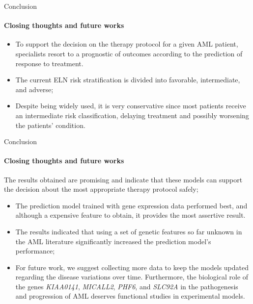 \begin{frame}{Conclusion}
    \framesubtitle{Closing thoughts and future works}

    \begin{itemize}
        \item To support the decision on the therapy protocol for a given AML patient, specialists resort to a prognostic of outcomes according to the prediction of response to treatment.
        \item The current ELN risk stratification is divided into favorable, intermediate, and adverse;
        \item Despite being widely used, it is very conservative since most patients receive an intermediate risk classification, delaying treatment and possibly worsening the patients' condition.
        
    \end{itemize}

\end{frame}

\begin{frame}{Conclusion}
    \framesubtitle{Closing thoughts and future works}

The results obtained are promising and indicate that these models can support the decision about the most appropriate therapy protocol safely;

    \begin{itemize}
    
        
        \item The prediction model trained with gene expression data performed best, and although a expensive feature to obtain, it provides the most assertive result.

        \item The results indicated that using a set of genetic features so far unknown in the AML literature significantly increased the prediction model's performance;

        \item For future work, we suggest collecting more data to keep the models updated regarding the disease variations over time. Furthermore, the biological role of the genes \textit{KIAA0141}, \textit{MICALL2}, \textit{PHF6}, and \textit{SLC92A} in the pathogenesis and progression of AML deserves functional studies in experimental models.

        
    \end{itemize}
    
\end{frame}

